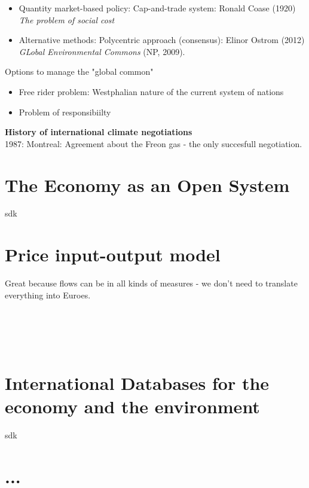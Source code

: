 \begin{multicols}{2}
\begin{itemize}
\begin{itemize}
    \item Quantity market-based policy: Cap-and-trade system: Ronald Coase (1920) \textit{The problem of social cost}
    \item Alternative methods: Polycentric approach (consensus): Elinor Ostrom (2012) \textit{GLobal Environmental Commons} (NP, 2009).
  \end{itemize}
  Options to manage the "global common"
  \begin{itemize}
    \item Free rider problem: Westphalian nature of the current system of nations
    \item Problem of responsibiilty
  \end{itemize}
\end{itemize}
\textbf{History of international climate negotiations}\\
1987: Montreal: Agreement about the Freon gas - the only succesfull negotiation.
\end{multicols}

\section{The Economy as an Open System} %
\begin{multicols}{2}
sdk


\end{multicols}

\section{Price input-output model} %
\begin{multicols}{2}
Great because flows can be in all kinds of measures - we don't need to translate everything into Euroes.\\ \\ \\ \\ \\


\end{multicols}
\section{International Databases for the economy and the environment} %
\begin{multicols}{2}
sdk


\end{multicols}


\section{...} %
\begin{multicols}{2}


\end{multicols}


